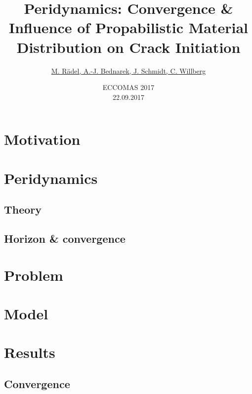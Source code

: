 \documentclass[handout,aspectratio=169]{beamer}
\title{Peridynamics: Convergence \& Influence of Propabilistic Material Distribution on Crack Initiation}
\date{ECCOMAS 2017 \\22.09.2017}
\author{\href{mailto:martin.raedel@dlr.de}{M. R\"adel, A.-J. Bednarek, J. Schmidt, C. Willberg}}
\begin{document}

\maketitle




\section{Motivation}



\section{Peridynamics}

\subsection{Theory}

\subsection{Horizon \& convergence}


\section{Problem}



\section{Model}



\section{Results}

\subsection{Convergence}




\end{document}
